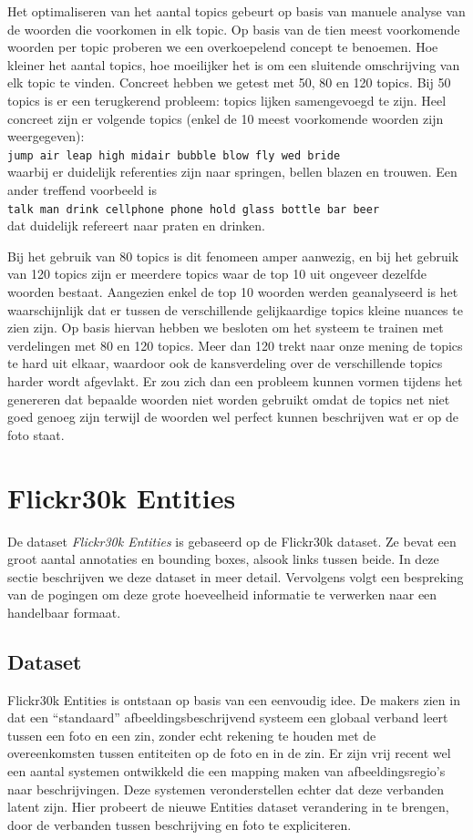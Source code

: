 Het optimaliseren van het aantal topics gebeurt op basis van manuele analyse van de woorden die voorkomen in elk topic. Op basis van de tien meest voorkomende woorden per topic proberen we een overkoepelend concept te benoemen. Hoe kleiner het aantal topics, hoe moeilijker het is om een sluitende omschrijving van elk topic te vinden. Concreet hebben we getest met 50, 80 en 120 topics. Bij 50 topics is er een terugkerend probleem: topics lijken samengevoegd te zijn. Heel concreet zijn er volgende topics (enkel de 10 meest voorkomende woorden zijn weergegeven): \\
\texttt{jump air leap high midair bubble blow fly wed bride}
\\
waarbij er duidelijk referenties zijn naar springen, bellen blazen en trouwen. Een ander treffend voorbeeld is \\
\texttt{talk man drink cellphone phone hold glass bottle bar beer}
\\ dat duidelijk refereert naar praten en drinken.

Bij het gebruik van 80 topics is dit fenomeen amper aanwezig, en bij het gebruik van 120 topics zijn er meerdere topics waar de top 10 uit ongeveer dezelfde woorden bestaat. Aangezien enkel de top 10 woorden werden geanalyseerd is het waarschijnlijk dat er tussen de verschillende gelijkaardige topics kleine nuances te zien zijn. Op basis hiervan hebben we besloten om het systeem te trainen met verdelingen met 80 en 120 topics. Meer dan 120 trekt naar onze mening de topics te hard uit elkaar, waardoor ook de kansverdeling over de verschillende topics harder wordt afgevlakt. Er zou zich dan een probleem kunnen vormen tijdens het genereren dat bepaalde woorden niet worden gebruikt omdat de topics net niet goed genoeg zijn terwijl de woorden wel perfect kunnen beschrijven wat er op de foto staat.

\section{Flickr30k Entities}
De dataset \emph{Flickr30k Entities}\cite{Plummer2015} is gebaseerd op de Flickr30k dataset. Ze bevat een groot aantal annotaties en bounding boxes, alsook links tussen beide. In deze sectie beschrijven we deze dataset in meer detail. Vervolgens volgt een bespreking van de pogingen om deze grote hoeveelheid informatie te verwerken naar een handelbaar formaat.

\subsection{Dataset}
\label{sub:Dataset}
Flickr30k Entities is ontstaan op basis van een eenvoudig idee. De makers zien in dat een ``standaard'' afbeeldingsbeschrijvend systeem een globaal verband leert tussen een foto en een zin, zonder echt rekening te houden met de overeenkomsten tussen entiteiten op de foto en in de zin. Er zijn vrij recent wel een aantal systemen ontwikkeld die een mapping maken van afbeeldingsregio's naar beschrijvingen. Deze systemen veronderstellen echter dat deze verbanden latent zijn. Hier probeert de nieuwe Entities dataset verandering in te brengen, door de verbanden tussen beschrijving en foto te expliciteren.

